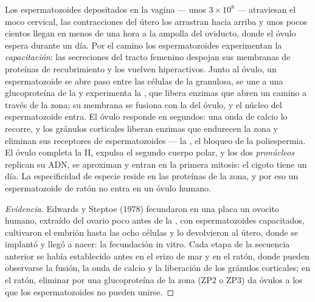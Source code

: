 \begin{proposition}\label{prop:b2:mammal-reproduction:fertilisation}
Los espermatozoides depositados en la vagina --- unos $3\times 10^{8}$ ---
atraviesan el moco cervical, las contracciones del útero los arrastran
hacia arriba y unos pocos cientos llegan en menos de una hora a la
ampolla del oviducto, donde el óvulo espera durante un día. Por el camino
los espermatozoides experimentan la \emph{capacitación}: las secreciones
del tracto femenino despojan sus membranas de proteínas de recubrimiento
y los vuelven hiperactivos. Junto al óvulo, un espermatozoide se abre paso
entre las células de la granulosa, se une a una glucoproteína de la
\emph{} y experimenta la \emph{}, que
libera enzimas que abren un camino a través de la zona; su membrana se
fusiona con la del óvulo, y el núcleo del espermatozoide entra. El óvulo
responde en segundos: una onda de calcio lo recorre, y los gránulos
corticales liberan enzimas que endurecen la zona y eliminan sus
receptores de espermatozoides --- la \emph{}, el bloqueo
de la poliespermia. El óvulo completa la  II, expulsa el segundo
cuerpo polar, y los dos \emph{pronúcleos}  replican su ADN, se
aproximan y entran en la primera mitosis: el cigoto tiene un día. La
especificidad de especie reside en las proteínas de la zona, y por eso un
espermatozoide de ratón no entra en un óvulo humano.
\end{proposition}
\begin{proof}[Evidencia]
Edwards y Steptoe (1978) fecundaron en una placa un ovocito humano,
extraído del ovario poco antes de la , con espermatozoides
capacitados, cultivaron el embrión hasta las ocho células y lo
devolvieron al útero, donde se implantó y llegó a nacer: la fecundación
in vitro. Cada etapa de la secuencia anterior se había establecido antes
en el erizo de mar y en el ratón, donde pueden observarse la fusión, la
onda de calcio y la liberación de los gránulos corticales; en el ratón,
eliminar por  una glucoproteína de la zona (ZP2 o ZP3) da óvulos
a los que los espermatozoides no pueden unirse.
\end{proof}


